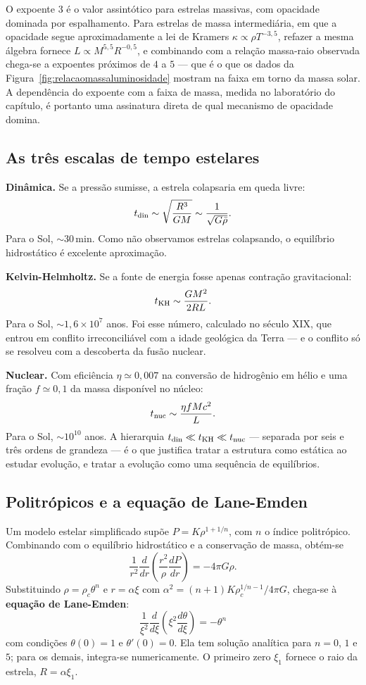 \documentclass[11pt,a4paper]{article}
\begin{document}
O expoente 3 é o valor assintótico para estrelas massivas, com opacidade dominada por espalhamento. Para estrelas de massa intermediária, em que a opacidade segue aproximadamente a lei de Kramers $\kappa\propto\rho T^{-3{,}5}$, refazer a mesma álgebra fornece $L\propto M^{5{,}5}R^{-0{,}5}$, e combinando com a relação massa-raio observada chega-se a expoentes próximos de $4$ a $5$ --- que é o que os dados da Figura~\ref{fig:relacaomassaluminosidade} mostram na faixa em torno da massa solar. A dependência do expoente com a faixa de massa, medida no laboratório do capítulo, é portanto uma assinatura direta de qual mecanismo de opacidade domina.

\subsection*{As três escalas de tempo estelares}

\textbf{Dinâmica.} Se a pressão sumisse, a estrela colapsaria em queda livre:
\[
t_{\rm din}\sim\sqrt{\frac{R^{3}}{GM}}\sim\frac{1}{\sqrt{G\bar{\rho}}}.
\]
Para o Sol, $\sim30\,\mathrm{min}$. Como não observamos estrelas colapsando, o equilíbrio hidrostático é excelente aproximação.

\textbf{Kelvin-Helmholtz.} Se a fonte de energia fosse apenas contração gravitacional:
\[
t_{\rm KH}\sim\frac{GM^{2}}{2RL}.
\]
Para o Sol, $\sim1{,}6\times10^{7}$ anos. Foi esse número, calculado no século XIX, que entrou em conflito irreconciliável com a idade geológica da Terra --- e o conflito só se resolveu com a descoberta da fusão nuclear.

\textbf{Nuclear.} Com eficiência $\eta\simeq0{,}007$ na conversão de hidrogênio em hélio e uma fração $f\simeq0{,}1$ da massa disponível no núcleo:
\[
t_{\rm nuc}\sim\frac{\eta f Mc^{2}}{L}.
\]
Para o Sol, $\sim10^{10}$ anos. A hierarquia $t_{\rm din}\ll t_{\rm KH}\ll t_{\rm nuc}$ --- separada por seis e três ordens de grandeza --- é o que justifica tratar a estrutura como estática ao estudar evolução, e tratar a evolução como uma sequência de equilíbrios.

\subsection*{Politrópicos e a equação de Lane-Emden}

Um modelo estelar simplificado supõe $P=K\rho^{1+1/n}$, com $n$ o índice politrópico. Combinando com o equilíbrio hidrostático e a conservação de massa, obtém-se
\[
\frac{1}{r^{2}}\frac{d}{dr}\left(\frac{r^{2}}{\rho}\frac{dP}{dr}\right)=-4\pi G\rho.
\]
Substituindo $\rho=\rho_c\theta^{n}$ e $r=\alpha\xi$ com $\alpha^{2}=(n+1)K\rho_c^{1/n-1}/4\pi G$, chega-se à \textbf{equação de Lane-Emden}:
\[
\boxed{\ \frac{1}{\xi^{2}}\frac{d}{d\xi}\left(\xi^{2}\frac{d\theta}{d\xi}\right)=-\theta^{n}\ }
\]
com condições $\theta(0)=1$ e $\theta'(0)=0$. Ela tem solução analítica para $n=0$, $1$ e $5$; para os demais, integra-se numericamente. O primeiro zero $\xi_1$ fornece o raio da estrela, $R=\alpha\xi_1$.
\end{document}
